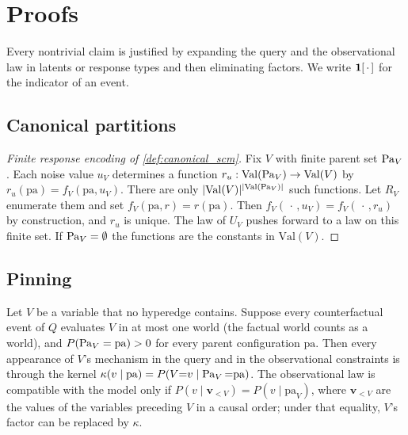 \section{Proofs}
\label{app:proofs}

Every nontrivial claim is justified by expanding the query and the
observational law in latents or response types and then eliminating
factors. We write $\mathbf{1}[\,\cdot\,]$ for the indicator of an event.

\subsection{Canonical partitions}
\label{app:canon}

\begin{proof}[Finite response encoding of \cref{def:canonical_scm}]
Fix $V$ with finite parent set $\operatorname{Pa}_V$. Each noise value $u_V$
determines a function
$r_u:\mathrm{Val}(\operatorname{Pa}_V)\to\mathrm{Val}(V)$ by
$r_u(\mathrm{pa})=f_V(\mathrm{pa},u_V)$. There are only
$|\mathrm{Val}(V)|^{|\mathrm{Val}(\operatorname{Pa}_V)|}$ such functions. Let
$R_V$ enumerate them and set $f_V(\mathrm{pa},r)=r(\mathrm{pa})$.
Then $f_V(\,\cdot\,,u_V)=f_V(\,\cdot\,,r_u)$ by construction, and
$r_u$ is unique. The law of $U_V$ pushes forward to a law on this
finite set. If $\operatorname{Pa}_V=\emptyset$ the functions are the constants in
$\mathrm{Val}(V)$.
\end{proof}

\subsection{Pinning}
\label{app:middle}

\begin{lemma}
\label{lem:middle}
Let $V$ be a variable that no hyperedge contains. Suppose every counterfactual event of $Q$
evaluates $V$ in at most one world (the factual world counts as a world), and
$P(\operatorname{Pa}_V=\mathrm{pa})>0$ for every parent configuration $\mathrm{pa}$. Then
every appearance of $V$'s mechanism in the query and in the observational
constraints is through the kernel $\kappa(v\mid\mathrm{pa})=P(V{=}v\mid\operatorname{Pa}_V{=}\mathrm{pa})$.
The observational law is compatible with the model only if
$P(v\mid \mathbf{v}_{<V})=P(v\mid\mathrm{pa}_V)$, where $\mathbf{v}_{<V}$ are
the values of the variables preceding $V$ in a causal order; under that
equality, $V$'s factor can be replaced by $\kappa$.
\end{lemma}


